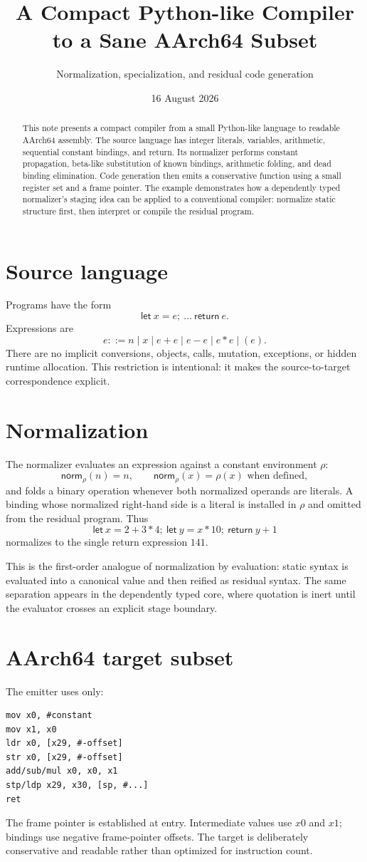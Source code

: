 \documentclass[11pt,a4paper]{article}
\title{A Compact Python-like Compiler to a Sane AArch64 Subset}
\author{Normalization, specialization, and residual code generation}
\date{16 August 2026}
\begin{document}
\maketitle
\begin{abstract}
This note presents a compact compiler from a small Python-like language to readable AArch64 assembly. The source language has integer literals, variables, arithmetic, sequential constant bindings, and return. Its normalizer performs constant propagation, beta-like substitution of known bindings, arithmetic folding, and dead binding elimination. Code generation then emits a conservative function using a small register set and a frame pointer. The example demonstrates how a dependently typed normalizer's staging idea can be applied to a conventional compiler: normalize static structure first, then interpret or compile the residual program.
\end{abstract}
\section{Source language}
Programs have the form
\[
\mathsf{let}\ x=e;\ \ldots\ \mathsf{return}\ e.
\]
Expressions are
\[
e ::= n \mid x \mid e+e \mid e-e \mid e*e \mid (e).
\]
There are no implicit conversions, objects, calls, mutation, exceptions, or hidden runtime allocation. This restriction is intentional: it makes the source-to-target correspondence explicit.

\section{Normalization}
The normalizer evaluates an expression against a constant environment $\rho$:
\[
\mathsf{norm}_\rho(n)=n,
\qquad
\mathsf{norm}_\rho(x)=\rho(x)\text{ when defined},
\]
and folds a binary operation whenever both normalized operands are literals. A binding whose normalized right-hand side is a literal is installed in $\rho$ and omitted from the residual program. Thus
\[
\mathsf{let}\ x=2+3*4;\ \mathsf{let}\ y=x*10;\ \mathsf{return}\ y+1
\]
normalizes to the single return expression $141$.

This is the first-order analogue of normalization by evaluation: static syntax is evaluated into a canonical value and then reified as residual syntax. The same separation appears in the dependently typed core, where quotation is inert until the evaluator crosses an explicit stage boundary.

\section{AArch64 target subset}
The emitter uses only:
\begin{lstlisting}
mov x0, #constant
mov x1, x0
ldr x0, [x29, #-offset]
str x0, [x29, #-offset]
add/sub/mul x0, x0, x1
stp/ldp x29, x30, [sp, #...]
ret
\end{lstlisting}
The frame pointer is established at entry. Intermediate values use $x0$ and $x1$; bindings use negative frame-pointer offsets. The target is deliberately conservative and readable rather than optimized for instruction count.
\end{document}
